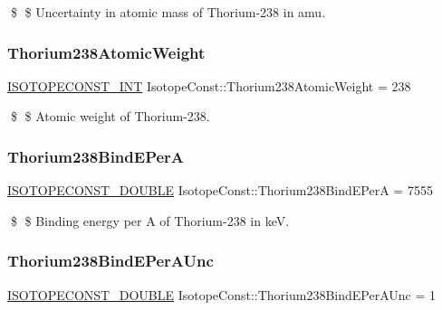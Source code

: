 \$ \$ Uncertainty in atomic mass of Thorium-\/238 in amu. \mbox{\label{group___isotope_const-_thorium-_th238_ga0a6ff501b1d944fcac3df7e6ccbe2438}} 
\subsubsection{\texorpdfstring{Thorium238\+Atomic\+Weight}{Thorium238AtomicWeight}}
{\footnotesize\ttfamily \mbox{\hyperlink{group___isotope_const-_macros_ga5f18360b3e99483a35c32d789e62621c}{I\+S\+O\+T\+O\+P\+E\+C\+O\+N\+S\+T\+\_\+\+I\+NT}} Isotope\+Const\+::\+Thorium238\+Atomic\+Weight = 238}

\$ \$ Atomic weight of Thorium-\/238. \mbox{\label{group___isotope_const-_thorium-_th238_ga814c008b2dca538e3638b33a39bab72d}} 
\subsubsection{\texorpdfstring{Thorium238\+Bind\+E\+PerA}{Thorium238BindEPerA}}
{\footnotesize\ttfamily \mbox{\hyperlink{group___isotope_const-_macros_ga8f45a7272ce02c0b4c65c44636ed719a}{I\+S\+O\+T\+O\+P\+E\+C\+O\+N\+S\+T\+\_\+\+D\+O\+U\+B\+LE}} Isotope\+Const\+::\+Thorium238\+Bind\+E\+PerA = 7555}

\$ \$ Binding energy per A of Thorium-\/238 in keV. \mbox{\label{group___isotope_const-_thorium-_th238_ga59ccabcb844c440cea1f4e80b2bd96d4}} 
\subsubsection{\texorpdfstring{Thorium238\+Bind\+E\+Per\+A\+Unc}{Thorium238BindEPerAUnc}}
{\footnotesize\ttfamily \mbox{\hyperlink{group___isotope_const-_macros_ga8f45a7272ce02c0b4c65c44636ed719a}{I\+S\+O\+T\+O\+P\+E\+C\+O\+N\+S\+T\+\_\+\+D\+O\+U\+B\+LE}} Isotope\+Const\+::\+Thorium238\+Bind\+E\+Per\+A\+Unc = 1}

